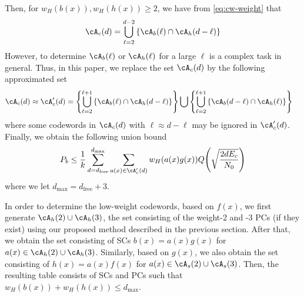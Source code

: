 Then, for $w_H(b(x)), w_H(h(x)) \geq 2$, we have from \eqref{eq:cw-weight} that
\begin{align}
\cA_c(d) = \bigcup_{\ell = 2}^{d-2} \left\{\cA_b(\ell) \cap \cA_h(d-\ell)\right\}
\label{Eq:exactset}
\end{align}
However, to determine $\cA_b(\ell)$ or $\cA_h(\ell)$ for a large $\ell$ is a complex task in general. Thus, in this paper, we replace the set $\cA_c(d)$ by the following approximated set %
\begin{equation}
\begin{split}
\cA_c(d) \approx \cA_c'(d) &= \left\{\bigcup_{\ell = 2}^{\ell+1} \left\{\cA_b(\ell) \cap \cA_h(d-\ell)\right\}\right\}\bigcup \left\{\bigcup_{\ell = 2}^{\ell+1} \left\{\cA_b(d-\ell) \cap \cA_h(\ell)\right\}\right\}
\end{split}
\label{setApprox}
\end{equation}
where some codewords in $\cA_c(d)$ with $\ell \approx d-\ell$ may be ignored in $\cA_c'(d)$.
Finally, we obtain the following union bound
\begin{align}
P_b \leq \frac{1}{k} \sum_{d=d_{\text{free}}}^{d_{\text{max}}} \sum_{a(x) \in \cA'_c(d)}w_H(a(x)g(x)) Q\Bigg( \sqrt{\frac{2dE_c}{N_0}}\Bigg)
\label{novelEq7}
\end{align}
where we let $d_{\text{max}}=d_{\text{free}}+3$. 

In order to determine the low-weight codewords, based on $f(x)$, we first generate $\cA_h(2)\cup\cA_h(3)$, the set consisting of the weight-2 and -3 PCs (if they exist) using our proposed method described in the previous section. After that, we obtain the set consisting of SCs $b(x)=a(x)g(x)$ for $a(x) \in \cA_h(2)\cup\cA_h(3)$. Similarly, based on $g(x)$, we also obtain the set consisting of $h(x)=a(x)f(x)$ for $a(x) \in \cA_s(2)\cup\cA_s(3)$. Then, the resulting table consists of SCs and PCs such that $w_H(b(x))+w_H(h(x)) \leq d_{\text{max}}$.

